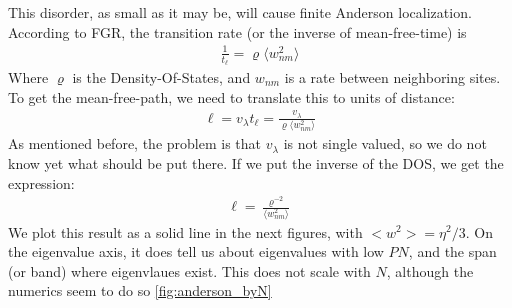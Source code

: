 \documentclass[onecolumn,fleqn,longbibliography]{revtex4}
\begin{document}
This disorder, as small as it may be, will cause finite Anderson localization.
According to FGR, the transition rate (or the inverse of mean-free-time) is
\begin{align}
\frac{1}{t_\ell} = \varrho \langle w_{nm}^2\rangle
\end{align}
Where $\varrho$ is the Density-Of-States, and $w_{nm}$ is a rate between
neighboring sites.
To get the mean-free-path, we need to translate this to units of distance:
\begin{align}
\ell = v_\lambda t_\ell = \frac{v_\lambda}{\varrho \langle w_{nm}^2\rangle}
\end{align}
As mentioned before, the problem is that $v_\lambda$ is not single valued,
so we do not know yet what should be put there. If we put the inverse of 
the DOS, we get the expression:
\begin{align}
\ell = \frac{\varrho^{-2}}{ \langle w_{nm}^2\rangle}
\end{align}
We plot this result as a solid line in the next figures, with $<w^2> = \eta^2/3$.
On the eigenvalue axis, it does tell us about eigenvalues with low $PN$,
and the span (or band) where eigenvlaues exist. This does not scale with $N$, although 
the numerics seem to do so \autoref{fig:anderson_byN}
\end{document}
